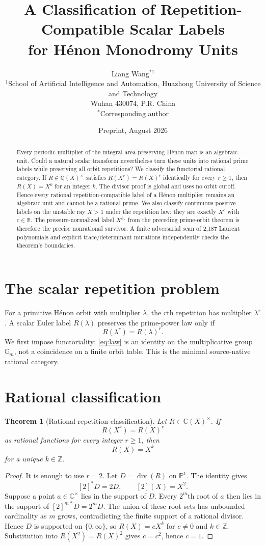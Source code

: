 \documentclass[11pt]{article}
\title{A Classification of Repetition-Compatible Scalar Labels\\for H\'enon Monodromy Units}
\author{Liang Wang$^{*1}$\\
\small $^{1}$School of Artificial Intelligence and Automation, Huazhong University of Science and Technology\\
\small Wuhan 430074, P.R. China\\
\small $^*$Corresponding author}
\date{Preprint, August 2026}
\newtheorem{theorem}{Theorem}[section]
\theoremstyle{remark}\newtheorem{remark}[theorem]{Remark}
\begin{document}
\maketitle
\begin{abstract}
Every periodic multiplier of the integral area-preserving H\'enon map is an
algebraic unit.  Could a natural scalar transform nevertheless turn these
units into rational prime labels while preserving all orbit repetitions?  We
classify the functorial rational category.  If
$R\in\mathbb Q(X)^\times$ satisfies $R(X^r)=R(X)^r$ identically for every
$r\ge1$, then $R(X)=X^k$ for an integer $k$.  The divisor proof is global and
uses no orbit cutoff.  Hence every rational repetition-compatible label of a
H\'enon multiplier remains an algebraic unit and cannot be a rational prime.
We also classify continuous positive labels on the unstable ray $X>1$
under the repetition law: they are exactly $X^c$ with $c\in\mathbb R$.  The
pressure-normalized label $X^{h_*}$ from the preceding prime-orbit theorem is
therefore the precise nonrational survivor.  A finite
adversarial scan of 2,187 Laurent polynomials and explicit trace/determinant
mutations independently checks the theorem's boundaries.
\end{abstract}

\section{The scalar repetition problem}
For a primitive H\'enon orbit with multiplier $\lambda$, the $r$th repetition
has multiplier $\lambda^r$.  A scalar Euler label $R(\lambda)$ preserves the
prime-power law only if
\begin{equation}\label{eq:law}
R(\lambda^r)=R(\lambda)^r.
\end{equation}
We first impose functoriality: \eqref{eq:law} is an identity on the
multiplicative group $\mathbb G_m$, not a coincidence on a finite orbit
table.  This is the minimal source-native rational category.

\section{Rational classification}
\begin{theorem}[Rational repetition classification]\label{thm:rational}
Let $R\in\mathbb C(X)^\times$.  If
\[
R(X^r)=R(X)^r
\]
as rational functions for every integer $r\ge1$, then
\[
\boxed{R(X)=X^k}
\]
for a unique $k\in\mathbb Z$.
\end{theorem}
\begin{proof}
It is enough to use $r=2$.  Let $D=\operatorname{div}(R)$ on
$\mathbb P^1$.  The identity gives
\[
[2]^*D=2D,
\qquad [2](X)=X^2.
\]
Suppose a point $a\in\mathbb C^\times$ lies in the support of $D$.  Every
$2^m$th root of $a$ then lies in the support of $[2]^{m*}D=2^mD$.  The
union of these root sets has unbounded cardinality as $m$ grows,
contradicting the finite support of a rational divisor.  Hence $D$ is supported on
$\{0,\infty\}$, so $R(X)=cX^k$ for $c\ne0$ and $k\in\mathbb Z$.  Substitution
into $R(X^2)=R(X)^2$ gives $c=c^2$, hence $c=1$.
\end{proof}
\end{document}
